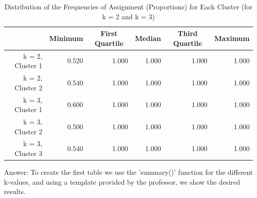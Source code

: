 \documentclass[a4paper,10pt]{article}\usepackage[]{graphicx}\usepackage[]{xcolor}
\begin{document}
\begin{table}[ht]
\centering
\begingroup\footnotesize
\begin{tabular}{rrrrrr}
  \hline
 & \multicolumn{1}{c}{\bf Minimum} & \multicolumn{1}{c}{\bf First Quartile} & \multicolumn{1}{c}{\bf Median} & \multicolumn{1}{c}{\bf Third Quartile} & \multicolumn{1}{c}{\bf Maximum} \\ 
  \hline
k = 2, Cluster 1 & 0.520 & 1.000 & 1.000 & 1.000 & 1.000 \\ 
  k = 2, Cluster 2 & 0.540 & 1.000 & 1.000 & 1.000 & 1.000 \\ 
  k = 3, Cluster 1 & 0.600 & 1.000 & 1.000 & 1.000 & 1.000 \\ 
  k = 3, Cluster 2 & 0.500 & 1.000 & 1.000 & 1.000 & 1.000 \\ 
  k = 3, Cluster 3 & 0.540 & 1.000 & 1.000 & 1.000 & 1.000 \\ 
   \hline
\end{tabular}
\endgroup
\caption{Distribution of the Frequencies of Assignment
                   (Proportions) for Each Cluster (for k = 2 and k = 3)} 
\label{tab:frequency}
\end{table}


Answer: To create the first table we use the 'summary()' function for the
different k-values, and using a template provided by the professor, we show the
desired results.
\end{document}
